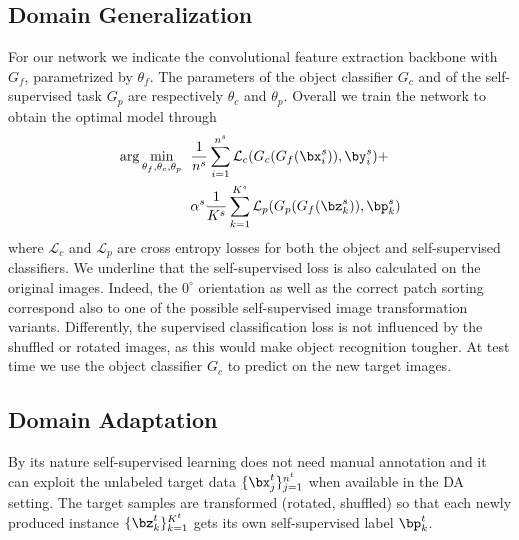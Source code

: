 \subsection{Domain Generalization}
For our network we indicate the convolutional feature extraction backbone with $G_f$, parametrized by $\theta_f$. The parameters of the object classifier $G_c$ and of the self-supervised task $G_p$ are respectively $\theta_c$ and $\theta_p$. Overall we train the network to obtain the optimal model through \vspace{-3mm}
\begin{align} \small
    \arg \min_{\theta_f, \theta_c, \theta_p} ~~  & 
    \frac{1}{n^s} \sum_{i=1}^{n^s}   \mathcal{L}_c(G_c(G_f(\bx^s_i)),\by_i^s) +  \nonumber \\
    & \alpha^s \frac{1}{K^s}\sum_{k=1}^{K^s}\mathcal{L}_p(G_p(G_f(\bz^s_k)),\bp_k^s)
    \label{equationDG}\vspace{-5mm}
\end{align}
where $\mathcal{L}_c$ and $\mathcal{L}_p$ are cross entropy losses for both the object and self-supervised classifiers. We underline that the self-supervised loss is also calculated on the original images. Indeed, the $0^\circ$ orientation as well as the correct patch sorting correspond
also to one of the possible self-supervised image transformation variants. Differently, the supervised classification loss is not influenced by the shuffled or rotated images, as this would make object recognition tougher. At test time we use the object classifier $G_c$ to predict on the new target images.

\subsection{Domain Adaptation}
By its nature self-supervised learning does not need manual annotation and it can exploit the unlabeled target data $\{{\bx}_j^t\}_{j=1}^{n^t}$ when available in the DA setting.
The target samples are transformed (rotated, shuffled) so that each newly produced instance $\{{\bz}_k^t\}_{k=1}^{K^t}$ gets its own self-supervised label ${\bp}_k^t$.

